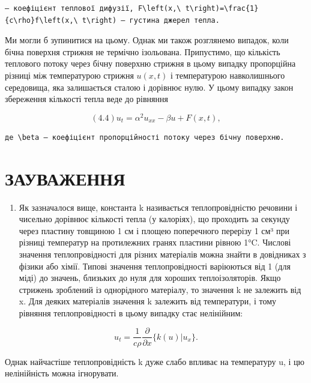 \documentclass[
  ukrainian,
]{article}
\providecommand{\tightlist}{%
  \setlength{\itemsep}{0pt}\setlength{\parskip}{0pt}}
\begin{document}
\begin{verbatim}
— коефіцієнт теплової дифузії, F\left(x,\ t\right)=\frac{1}{c\rho}f\left(x,\ t\right) — густина джерел тепла.
\end{verbatim}

Ми могли б зупинитися на цьому. Однак ми також розглянемо випадок, коли
бічна поверхня стрижня не термічно ізольована. Припустимо, що кількість
теплового потоку через бічну поверхню стрижня в цьому випадку
пропорційна різниці між температурою стрижня \(u(x,t)\) і температурою
навколишнього середовища, яка залишається сталою і дорівнює нулю. У
цьому випадку закон збереження кількості тепла веде до рівняння

\[
(4.4) u_t = \alpha^2 u_{xx} - \beta u + F(x, t),
\]

\begin{verbatim}
де \beta — коефіцієнт пропорційності потоку через бічну поверхню.
\end{verbatim}

\section{ЗАУВАЖЕННЯ}\label{ux437ux430ux443ux432ux430ux436ux435ux43dux43dux44f-3}

\begin{enumerate}
\def\labelenumi{\arabic{enumi}.}
\tightlist
\item
  Як зазначалося вище, константа k називається теплопровідністю речовини
  і чисельно дорівнює кількості тепла (у калоріях), що проходить за
  секунду через пластину товщиною 1 см і площею поперечного перерізу 1
  см³ при різниці температур на протилежних гранях пластини рівною 1°C.
  Числові значення теплопровідності для різних матеріалів можна знайти в
  довідниках з фізики або хімії. Типові значення теплопровідності
  варіюються від 1 (для міді) до значень, близьких до нуля для хороших
  теплоізоляторів. Якщо стрижень зроблений із однорідного матеріалу, то
  значення k не залежить від x. Для деяких матеріалів значення k
  залежить від температури, і тому рівняння теплопровідності в цьому
  випадку стає нелінійним:
\end{enumerate}

\[
u_{t} = \frac{1}{c\rho} \frac{\partial}{\partial x} \{ k (u) | u_{x} \}.
\]

Однак найчастіше теплопровідність k дуже слабо впливає на температуру u,
і цю нелінійність можна ігнорувати.
\end{document}

